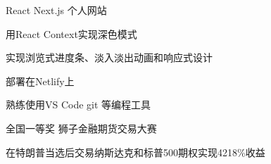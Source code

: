 

\begin{cventries}

  \cventry
    {React Next.js} %
    {个人网站} %
    {} %
    {} %
    {
      \begin{cvitems} %
        \item {用React Context实现深色模式}
        \item {实现浏览式进度条、淡入淡出动画和响应式设计}
        \item {部署在Netlify上}
        \item {熟练使用VS Code git 等编程工具}
      \end{cvitems}
    }


\cventry
{全国一等奖} %
{狮子金融期货交易大赛} %
{} %
{} %
{
  \begin{cvitems} %
    \item {在特朗普当选后交易纳斯达克和标普500期权实现4218\%收益}
  \end{cvitems}
  }

\end{cventries}



  
